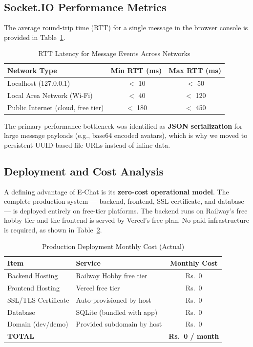 \documentclass[12pt,a4paper,oneside]{report}
\newcommand{\rupee}{Rs.\ }
\begin{document}
\subsection{Socket.IO Performance Metrics}
\label{subsec:socketio-performance}
The average round-trip time (RTT) for a single message in the browser console
is provided in Table~\ref{tab:latency}.

\begin{table}[H]
\centering
\caption{RTT Latency for Message Events Across Networks}
\label{tab:latency}
\begin{tabular}{|l|c|c|}
\hline
\textbf{Network Type} & \textbf{Min RTT (ms)} & \textbf{Max RTT (ms)} \\
\hline
Localhost (127.0.0.1) & $<$ 10 & $<$ 50 \\
\hline
Local Area Network (Wi-Fi) & $<$ 40 & $<$ 120 \\
\hline
Public Internet (cloud, free tier) & $<$ 180 & $<$ 450 \\
\hline
\end{tabular}
\end{table}

The primary performance bottleneck was identified as \textbf{JSON serialization} for
large message payloads (e.g., base64 encoded avatars), which is why we moved
to persistent UUID-based file URLs instead of inline data.

\subsection{Deployment and Cost Analysis}
\label{subsec:deployment-cost}
A defining advantage of E-Chat is its \textbf{zero-cost operational model}.
The complete production system --- backend, frontend, SSL certificate, and
database --- is deployed entirely on free-tier platforms. The backend runs on
Railway's free hobby tier and the frontend is served by Vercel's free plan.
No paid infrastructure is required, as shown in Table~\ref{tab:costs}.

\begin{table}[H]
\centering
\caption{Production Deployment Monthly Cost (Actual)}
\label{tab:costs}
\begin{tabular}{|l|l|c|}
\hline
\textbf{Item} & \textbf{Service} & \textbf{Monthly Cost} \\
\hline
Backend Hosting & Railway Hobby free tier & \rupee{}0 \\
\hline
Frontend Hosting & Vercel free tier & \rupee{}0 \\
\hline
SSL/TLS Certificate & Auto-provisioned by host & \rupee{}0 \\
\hline
Database & SQLite (bundled with app) & \rupee{}0 \\
\hline
Domain (dev/demo) & Provided subdomain by host & \rupee{}0 \\
\hline
\textbf{TOTAL} & & \textbf{\rupee{}0 / month} \\
\hline
\end{tabular}
\end{table}
\end{document}
